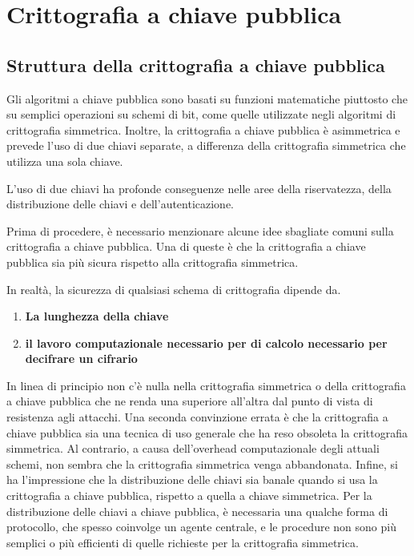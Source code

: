 \section{Crittografia a chiave pubblica}
\subsection{Struttura della crittografia a chiave pubblica}
Gli algoritmi a chiave pubblica sono basati su funzioni matematiche piuttosto che su semplici operazioni su schemi di bit, come quelle utilizzate negli algoritmi di crittografia simmetrica.  Inoltre, la crittografia a chiave pubblica è asimmetrica e prevede l'uso di due chiavi separate, a differenza della crittografia simmetrica che utilizza una sola chiave.

\singlespacing

L'uso di due chiavi ha profonde conseguenze nelle aree della riservatezza, della distribuzione delle chiavi e dell'autenticazione.

\singlespacing

Prima di procedere, è necessario menzionare alcune idee sbagliate comuni sulla crittografia a chiave pubblica. Una di queste è che la crittografia a chiave pubblica sia più sicura rispetto alla crittografia simmetrica. 
\singlespacing

In realtà, la sicurezza di qualsiasi schema di crittografia dipende da.

\begin{enumerate}

    \item \textbf{La lunghezza della chiave }
    
    \item \textbf{il lavoro computazionale necessario per di calcolo necessario per decifrare un cifrario}
\end{enumerate}

In linea di principio non c'è nulla nella crittografia simmetrica o della crittografia a chiave pubblica che ne renda una superiore all'altra dal punto di vista di resistenza agli attacchi. Una seconda convinzione errata è che la crittografia a chiave pubblica sia una tecnica di uso generale che ha reso obsoleta la crittografia simmetrica. Al contrario, a causa dell'overhead computazionale degli attuali schemi, non sembra che la crittografia simmetrica venga abbandonata.
Infine, si ha l'impressione che la distribuzione delle chiavi sia banale quando si usa la crittografia a chiave pubblica, rispetto a quella a chiave simmetrica. Per la distribuzione delle chiavi a chiave pubblica, è necessaria una qualche forma di protocollo, che spesso coinvolge un agente centrale, e le procedure non sono più semplici o più efficienti di quelle richieste per la crittografia simmetrica.

